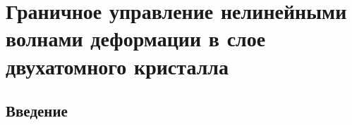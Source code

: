 \chapter{Граничное управление нелинейными волнами деформации в слое двухатомного кристалла}\label{ch:ch1}





\section{Введение}



